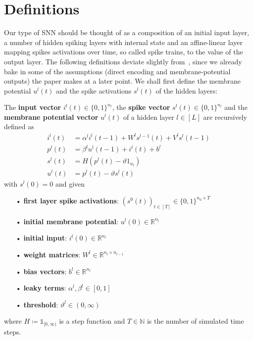\section{Definitions}
\label{ch:defs}

Our type of SNN should be thought of as a composition of an initial input layer, a number of hidden spiking layers with internal state and an affine-linear layer mapping spikes activations over time, so called spike trains, to the value of the output layer.
The following definitions deviate slightly from~\cite{nguyen2025timespikeunderstandingrepresentational}, since we already bake in some of the assumptions (direct encoding and membrane-potential outputs) the paper makes at a later point.
We shall first define the membrane potential \(u^l(t)\) and the spike activations \(s^l(t)\) of the hidden layers:

\begin{definition}
  The \textbf{input vector} \(i^l(t)∈\{0,1\}^{n_l}\), the \textbf{spike vector} \(s^l(t)∈\{0,1\}^{n_l}\) and the \textbf{membrane potential vector} \(u^l(t)\) of a hidden layer \(l∈[L]\) are recursively defined as
  \begin{align}
    i^l(t) & = α^li^l(t-1)+W^ls^{l-1}(t)+V^ls^l(t-1) \\
    p^l(t) & = β^lu^l(t-1)+i^l(t)+b^l \\
    s^l(t) & = H(p^l(t)-ϑ1_{n_l}) \\
    u^l(t) & = p^l(t)-ϑs^l(t)
  \end{align}
  with \(s^l(0)=0\) and given
  \begin{enumerate}
    \item[•] \textbf{first layer spike activations}: \((s^0(t))_{t∈[T]}∈\{0,1\}^{n_0×T}\)
    \item[•] \textbf{initial membrane potential}: \(u^l(0)∈ℝ^{n_l}\)
    \item[•] \textbf{initial input}: \(i^l(0)∈ℝ^{n_l}\)
    \item[•] \textbf{weight matrices}: \(W^l∈ℝ^{n_l×n_{l-1}}\)
    \item[•] \textbf{bias vectors}: \(b^l∈ℝ^{n_l}\)
    \item[•] \textbf{leaky terms}: \(α^l,β^l∈[0,1]\)
    \item[•] \textbf{threshold}: \(ϑ^l∈(0,∞)\)
  \end{enumerate}
  where \(H≔𝟙_{[0,∞)}\) is a step function and \(T∈ℕ\) is the number of simulated time steps.
\end{definition}

